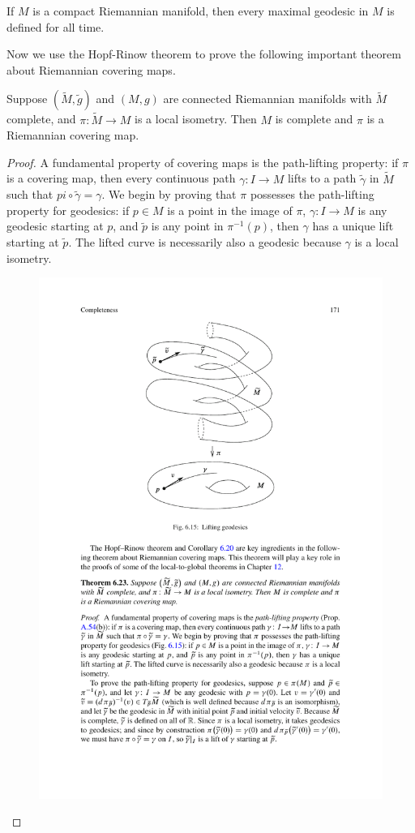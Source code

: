 \begin{corollary}
If $M$ is a compact Riemannian manifold, then every maximal geodesic in $M$ is defined for all time.
\end{corollary}
Now we use the Hopf-Rinow theorem to prove the following important theorem about Riemannian covering maps.
\begin{theorem}\label{Riemann local isometry complete is cover}
Suppose $(\widetilde{M},\tilde{g})$ and $(M,g)$ are connected Riemannian manifolds with $\widetilde{M}$ complete, and $\pi:\widetilde{M}\to M$ is a local isometry. Then $M$ is complete and $\pi$ is a Riemannian covering map.
\end{theorem}
\begin{proof}
A fundamental property of covering maps is the path-lifting property: if $\pi$ is a covering map, then every continuous path $\gamma:I\to M$ lifts to a path $\tilde{\gamma}$ in $\widetilde{M}$ such that $pi\circ\tilde{\gamma}=\gamma$. We begin by proving that $\pi$ possesses the path-lifting property for geodesics: if $p\in M$ is a point in the image of $\pi$, $\gamma:I\to M$ is any geodesic starting at $p$, and $\tilde{p}$ is any point in $\pi^{-1}(p)$, then $\gamma$ has a unique lift starting at $\tilde{p}$. The lifted curve is necessarily also a geodesic because $\gamma$ is a local isometry.
\begin{figure}[htbp]
\centering
\includegraphics{pictures/local-isometry-cover}

\end{figure}
\end{proof}
